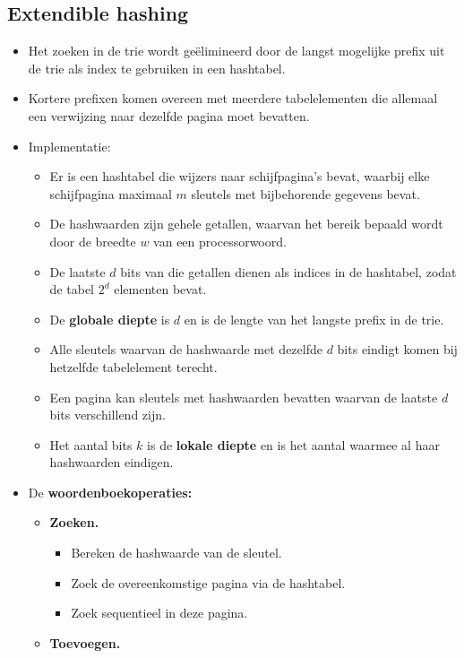 \subsection{Extendible hashing}
\begin{itemize}
    \item Het zoeken in de trie wordt geëlimineerd door de langst mogelijke prefix uit de trie als index te gebruiken in een hashtabel.
    \item Kortere prefixen komen overeen met meerdere tabelelementen die allemaal een verwijzing naar dezelfde pagina moet bevatten.
    \item Implementatie:
    \begin{itemize}
        \item Er is een hashtabel die wijzers naar schijfpagina's bevat, waarbij elke schijfpagina maximaal $m$ sleutels met bijbehorende gegevens bevat.
        \item De hashwaarden zijn gehele getallen, waarvan het bereik bepaald wordt door de breedte $w$ van een processorwoord.
        \item De laatste $d$ bits van die getallen dienen als indices in de hashtabel, zodat de tabel $2^d$ elementen bevat.
        \item De \textbf{globale diepte} is $d$ en is de lengte van het langste prefix in de trie.
        \item Alle sleutels waarvan de hashwaarde met dezelfde $d$ bits eindigt komen bij hetzelfde tabelelement terecht.
        \item Een pagina kan sleutels met hashwaarden bevatten waarvan de laatste $d$ bits verschillend zijn.
        \item Het aantal bits $k$ is de \textbf{lokale diepte} en is het aantal waarmee al haar hashwaarden eindigen.
    \end{itemize}
    \item De \textbf{woordenboekoperaties:}
    \begin{itemize}
        \item \textbf{Zoeken.}
        \begin{itemize}
            \item Bereken de hashwaarde van de sleutel.
            \item Zoek de overeenkomstige pagina via de hashtabel.
            \item Zoek sequentieel in deze pagina.
        \end{itemize}
        \item \textbf{Toevoegen.}

\end{itemize}
\end{itemize}
